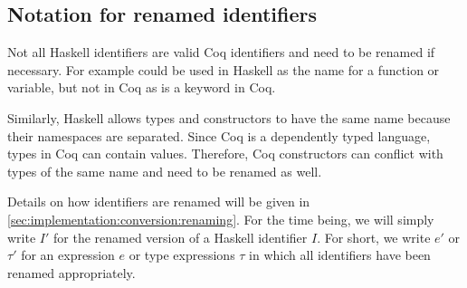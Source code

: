 \subsection{Notation for renamed identifiers} \label{sec:preliminaries:notation:renaming}
Not all Haskell identifiers are valid Coq identifiers and need to be renamed if necessary.
For example  could be used in Haskell as the name for a function or variable, but not in Coq as  is a keyword in Coq.

Similarly, Haskell allows types and constructors to have the same name because their namespaces are separated.
Since Coq is a dependently typed language, types in Coq can contain values.
Therefore, Coq constructors can conflict with types of the same name and need to be renamed as well.

Details on how identifiers are renamed will be given in \autoref{sec:implementation:conversion:renaming}.
For the time being, we will simply write $I'$ for the renamed version of a Haskell identifier $I$.
For short, we write $e'$ or $\tau'$ for an expression $e$ or type expressions $\tau$ in which all identifiers have been renamed appropriately.
